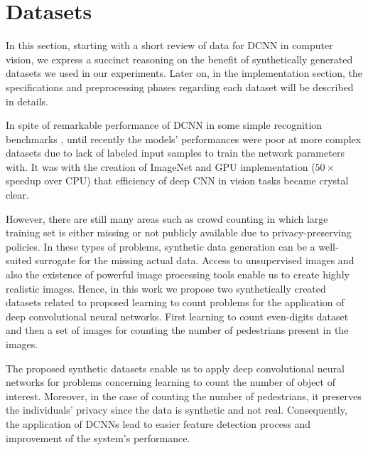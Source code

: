 
\section{Datasets} 

In this section, starting with a short review of data for DCNN in computer vision, we express a succinct reasoning on the benefit of synthetically generated datasets we used in our experiments. Later on, in the implementation section, the specifications and preprocessing phases regarding each dataset will be described in details. 


In spite of remarkable  performance of DCNN in some simple recognition benchmarks \cite{cirecsan2011convolutional, ciresan2015multi, wan2013regularization, cirecsan2012multi}, until recently the models' performances were poor at more complex datasets  \cite{griffin2007caltech} due to lack of labeled input samples to train the network parameters with. It was with the creation of ImageNet \cite{deng2009imagenet} and GPU implementation \cite{krizhevsky2012imagenet} ($50\times$ speedup over CPU) that efficiency of deep CNN in vision tasks became crystal clear.

However, there are still many areas such as crowd counting in which large training set is either missing or not publicly available due to privacy-preserving policies. In these types of problems, synthetic data generation can be a well-suited surrogate for the missing actual data.  Access to unsupervised images and also the existence of powerful image processing tools enable us to create highly realistic images. Hence, in this work we propose two synthetically created datasets related to proposed learning to count problems for the application of deep convolutional neural networks. First learning to count even-digits dataset and then a set of images for counting the number of pedestrians present in the images.   

The proposed synthetic datasets enable us to apply deep convolutional neural networks for problems concerning learning to count the number of object of interest. Moreover, in the case of counting the number of pedestrians, it preserves the individuals' privacy since the data is synthetic and not real. Consequently, the application of DCNNs lead to easier feature detection process and improvement of the system's performance. 


